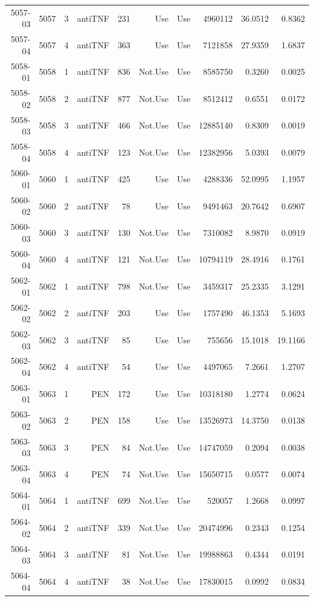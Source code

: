 {\begin{longtable}{ | r | r | r | r | r | r | r | r | r | r | }
5057-03 & 5057 & 3 & antiTNF & 231 & Use & Use & 4960112 & 36.0512 & 0.8362\\ 
5057-04 & 5057 & 4 & antiTNF & 363 & Use & Use & 7121858 & 27.9359 & 1.6837\\ 
5058-01 & 5058 & 1 & antiTNF & 836 & Not.Use & Use & 8585750 & 0.3260 & 0.0025\\ 
5058-02 & 5058 & 2 & antiTNF & 877 & Not.Use & Use & 8512412 & 0.6551 & 0.0172\\ 
5058-03 & 5058 & 3 & antiTNF & 466 & Not.Use & Use & 12885140 & 0.8309 & 0.0019\\ 
5058-04 & 5058 & 4 & antiTNF & 123 & Not.Use & Use & 12382956 & 5.0393 & 0.0079\\ 
5060-01 & 5060 & 1 & antiTNF & 425 & Use & Use & 4288336 & 52.0995 & 1.1957\\ 
5060-02 & 5060 & 2 & antiTNF & 78 & Use & Use & 9491463 & 20.7642 & 0.6907\\ 
5060-03 & 5060 & 3 & antiTNF & 130 & Not.Use & Use & 7310082 & 8.9870 & 0.0919\\ 
5060-04 & 5060 & 4 & antiTNF & 121 & Not.Use & Use & 10794119 & 28.4916 & 0.1761\\ 
5062-01 & 5062 & 1 & antiTNF & 798 & Not.Use & Use & 3459317 & 25.2335 & 3.1291\\ 
5062-02 & 5062 & 2 & antiTNF & 203 & Use & Use & 1757490 & 46.1353 & 5.1693\\ 
5062-03 & 5062 & 3 & antiTNF & 85 & Use & Use & 755656 & 15.1018 & 19.1166\\ 
5062-04 & 5062 & 4 & antiTNF & 54 & Use & Use & 4497065 & 7.2661 & 1.2707\\ 
5063-01 & 5063 & 1 & PEN & 172 & Use & Use & 10318180 & 1.2774 & 0.0624\\ 
5063-02 & 5063 & 2 & PEN & 158 & Use & Use & 13526973 & 14.3750 & 0.0138\\ 
5063-03 & 5063 & 3 & PEN & 84 & Not.Use & Use & 14747059 & 0.2094 & 0.0038\\ 
5063-04 & 5063 & 4 & PEN & 74 & Not.Use & Use & 15650715 & 0.0577 & 0.0074\\ 
5064-01 & 5064 & 1 & antiTNF & 699 & Not.Use & Use & 520057 & 1.2668 & 0.0997\\ 
5064-02 & 5064 & 2 & antiTNF & 339 & Not.Use & Use & 20474996 & 0.2343 & 0.1254\\ 
5064-03 & 5064 & 3 & antiTNF & 81 & Not.Use & Use & 19988863 & 0.4344 & 0.0191\\ 
5064-04 & 5064 & 4 & antiTNF & 38 & Not.Use & Use & 17830015 & 0.0992 & 0.0834\\ 

\end{longtable}}
